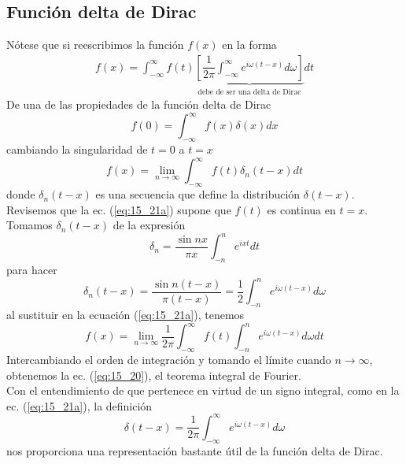 \subsection{Función delta de Dirac}
Nótese que si reescribimos la función $f(x)$ en la forma
\begin{align}
f(x)= \int_{-\infty}^{\infty} f(t) \underbrace{ \left[ \dfrac{1}{2 \pi} \int_{-\infty}^{\infty} e^{i \omega(t - x)} d \omega \right] }_{\mbox{debe de ser una delta de Dirac}} dt 
\label{eq:15_20a}
\end{align}
De una de las propiedades de la función delta de Dirac
\[ f(0) = \int_{-\infty}^{\infty} f(x) \delta(x) d x \]
cambiando la singularidad de $t=0$ a $t=x$
\begin{equation}
f(x) = \lim_{n \to \infty} \int_{-\infty}^{\infty} f(t) \delta_{n} (t - x) dt
\label{eq:15_21a} 
\end{equation}
donde $\delta_{n}(t - x)$ es una secuencia que define la distribución $\delta(t - x)$. Revisemos que la ec. (\ref{eq:15_21a}) supone que $f(t)$ es continua en $t=x$. Tomamos $\delta_{n} (t - x)$  de la expresión
\[ \delta_{n} = \dfrac{\sin n x}{\pi  x} \int_{-n}^{n} e^{i x t} dt \]
para hacer
\begin{equation}
\delta_{n} (t - x) = \dfrac{\sin n (t - x)}{\pi (t - x)} = \dfrac{1}{2} \int_{-n}^{n} e^{i \omega (t - x)} d \omega
\label{eq:15_21b}
\end{equation}
al sustituir en la ecuación (\ref{eq:15_21a}), tenemos
\begin{equation}
f(x) = \lim_{n \to \infty} \dfrac{1}{2 \pi} \int_{-\infty}^{\infty} f(t) \int_{-n}^{n} e^{i \omega (t - x)} d \omega d t
\label{eq:15_21c}
\end{equation}
Intercambiando el orden de integración y tomando el límite cuando $n \to \infty$, obtenemos la ec. (\ref{eq:15_20}), el teorema integral de Fourier.
\\
Con el entendimiento de que pertenece en virtud de un signo integral, como en la ec. (\ref{eq:15_21a}), la definición
\begin{equation}
\boxed{\delta(t - x) = \dfrac{1}{2 \pi} \int_{-\infty}^{\infty} e^{i \omega (t - x)} d \omega}
\label{eq:15_21d}
\end{equation}
nos proporciona una representación bastante útil de la función delta de Dirac.
